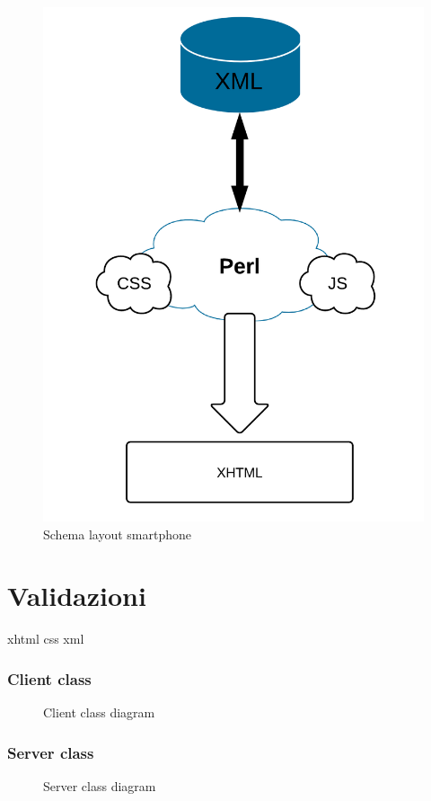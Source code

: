 \begin{center}
\begin{figure}[H]
\centering
\includegraphics[scale=0.55]{images/struttura.png}
\caption{Schema layout smartphone}
\end{figure}
\end{center}



\section{Validazioni}
xhtml
css
xml






\subsubsection{Client class }
\begin{center}
\begin{figure}[H]
\centering
\caption{Client class diagram}
\label{ww-lists }
\end{figure}
\end{center}



\subsubsection{Server class }
\begin{center}
\begin{figure}[H]
\centering
\caption{Server class diagram}
\label{ww-lists }
\end{figure}
\end{center}





